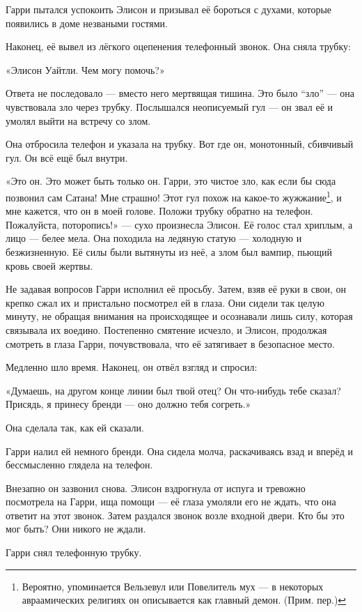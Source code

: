 \documentclass[a5paper, 9pt,
final, openany, twoside=true]{memoir}
\begin{document}
Гарри пытался успокоить Элисон и призывал её бороться с духами, которые появились в доме незваными гостями.

Наконец, её вывел из лёгкого оцепенения телефонный звонок. Она сняла трубку:\bigskip

«Элисон Уайтли. Чем могу помочь?»\bigskip

Ответа не последовало — вместо него мертвящая тишина. Это было ``зло'' — она чувствовала зло через трубку. Послышался неописуемый гул — он звал её и умолял выйти на встречу со злом.

Она отбросила телефон и указала на трубку. Вот где он, монотонный, сбивчивый гул. Он всё ещё был внутри.

«Это он. Это может быть только он. Гарри, это чистое зло, как если бы сюда позвонил сам Сатана! Мне страшно! Этот гул похож на какое-то жужжание\footnote[1]{Вероятно, упоминается Вельзевул или Повелитель мух — в некоторых авраамических религиях он описывается как главный демон. (Прим. пер.)}, и мне кажется, что он в моей голове. Положи трубку обратно на телефон. Пожалуйста, поторопись!» — сухо произнесла Элисон. Её голос стал хриплым, а лицо — белее мела. Она походила на ледяную статую — холодную и безжизненную. Её силы были вытянуты из неё, а злом был вампир, пьющий кровь своей жертвы.

Не задавая вопросов Гарри исполнил её просьбу. Затем, взяв её руки в свои, он крепко сжал их и пристально посмотрел ей в глаза. Они сидели так целую минуту, не обращая внимания на происходящее и осознавали лишь силу, которая связывала их воедино. Постепенно смятение исчезло, и Элисон, продолжая смотреть в глаза Гарри, почувствовала, что её затягивает в безопасное место.

Медленно шло время. Наконец, он отвёл взгляд и спросил:

«Думаешь, на другом конце линии был твой отец? Он что-нибудь тебе сказал? Присядь, я принесу бренди — оно должно тебя согреть.»

Она сделала так, как ей сказали.

Гарри налил ей немного бренди. Она сидела молча, раскачиваясь взад и вперёд и бессмысленно глядела на телефон.

Внезапно он зазвонил снова. Элисон вздрогнула от испуга и тревожно посмотрела на Гарри, ища помощи — её глаза умоляли его не ждать, что она ответит на этот звонок. Затем раздался звонок возле входной двери. Кто бы это мог быть? Они никого не ждали.

Гарри снял телефонную трубку.
\end{document}
